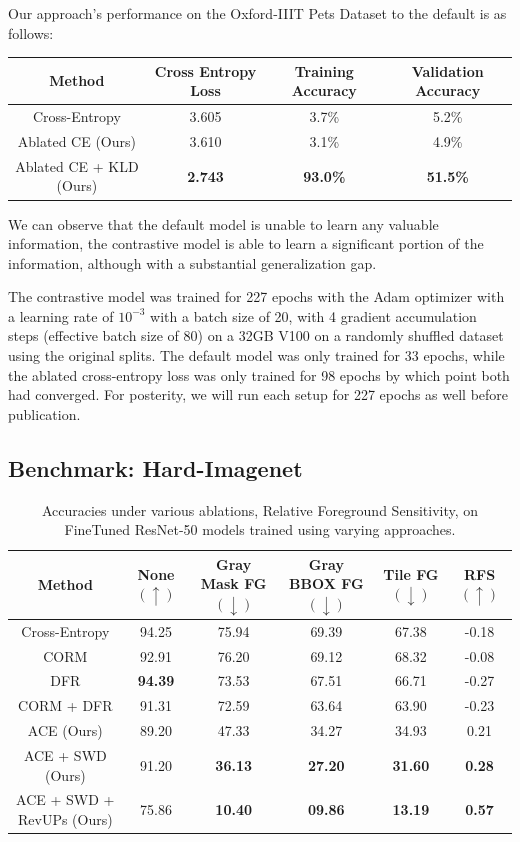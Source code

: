 \documentclass{article}
\theoremstyle{plain}
\theoremstyle{definition}
\theoremstyle{remark}
\begin{document}
Our approach's performance on the Oxford-IIIT Pets Dataset to the default is as follows:

\begin{table}[h]
	\centering
	\begin{tabular}{c|ccc}
		\toprule
		\textbf{Method}  & \textbf{Cross Entropy Loss}  & \textbf{Training Accuracy}   & \textbf{Validation Accuracy} \\
		\midrule
		Cross-Entropy & 3.605 & 3.7\% & 5.2\% \\
		Ablated CE (Ours) & 3.610 & 3.1\% & 4.9\% \\
		Ablated CE + KLD (Ours) & \bf 2.743 & \bf 93.0\% & \bf 51.5\% \\
		\bottomrule
	\end{tabular}
\end{table}

We can observe that the default model is unable to learn any valuable information, the contrastive model is able to learn a significant portion of the information, although with a substantial generalization gap.

The contrastive model was trained for 227 epochs with the Adam optimizer with a learning rate of $10^{-3}$ with a batch size of 20, with 4 gradient accumulation steps (effective batch size of 80) on a 32GB V100 on a randomly shuffled dataset using the original splits. The default model was only trained for 33 epochs, while the ablated cross-entropy loss was only trained for 98 epochs by which point both had converged. For posterity, we will run each setup for 227 epochs as well before publication.

\subsection{Benchmark: Hard-Imagenet}

\begin{table}[H]
	\centering
	\caption{Accuracies under various ablations, Relative Foreground Sensitivity, on FineTuned ResNet-50 models trained using varying approaches.}
	\begin{tabular}{c|c|ccc|c}
		\toprule
		\textbf{Method} & \textbf{None} $(\uparrow)$ & \textbf{Gray Mask FG} $(\downarrow)$ & \textbf{Gray BBOX FG} $(\downarrow)$ & \textbf{Tile FG} $(\downarrow)$ & \textbf{RFS} $(\uparrow)$ \\
		\midrule
		Cross-Entropy & 94.25 & 75.94 & 69.39 & 67.38 & -0.18 \\
		\midrule
		CORM & 92.91 & 76.20 & 69.12 & 68.32 & -0.08 \\
		DFR & \bf 94.39 & 73.53 & 67.51 & 66.71 & -0.27 \\
		CORM + DFR & 91.31 & 72.59 & 63.64 & 63.90 & -0.23 \\
		\midrule
		ACE (Ours) & 89.20 & 47.33 & 34.27 & 34.93 & 0.21 \\
		ACE + SWD (Ours) & 91.20 & \bf 36.13 & \bf 27.20 & \bf 31.60 & \bf 0.28 \\
		ACE + SWD + RevUPs (Ours) & 75.86 & \bf 10.40 & \bf 09.86 & \bf 13.19 & \bf 0.57 \\
		\bottomrule
	\end{tabular}
\end{table}
\end{document}
